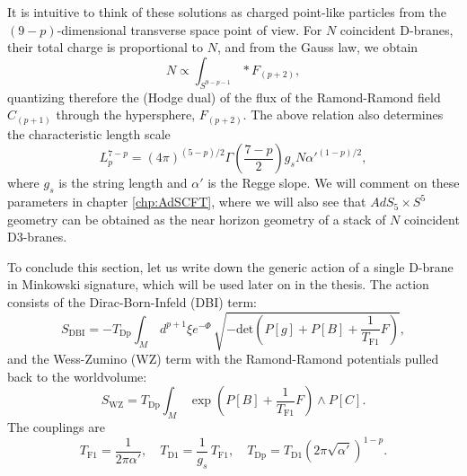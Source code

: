 It is intuitive to think of these solutions as charged point-like particles from the $(9-p)$-dimensional transverse space point of view.
For $N$ coincident D-branes, their total charge is proportional to $N$,
and from the Gauss law, we obtain
\begin{equation}
 N \propto \int_{S^{9-p-1}} *F_{(p+2)},
\end{equation}
quantizing therefore the (Hodge dual) of the flux of the Ramond-Ramond field $C_{(p+1)}$ through the hypersphere, $F_{(p+2)}$.
The above relation also determines the characteristic length scale 
\begin{equation}\label{characteristicLengthLp}
 L_p^{7-p} = (4\pi)^{(5-p)/2} \Gamma \left(\dfrac{7-p}{2}\right) g_s N \alpha'^{(1-p)/2},
\end{equation}
where $g_s$ is the string length and $\alpha'$ is the Regge slope. 
We will comment on these parameters in chapter \ref{chp:AdSCFT},
where we will also see that $AdS_5 \times S^5$ geometry can be obtained as the near horizon geometry of a stack of $N$ coincident D3-branes.

To conclude this section, 
let us write down the generic action of a single D-brane in Minkowski signature, 
which will be used later on in the thesis.
The action consists of the Dirac-Born-Infeld (DBI) term:
\begin{equation}\label{DBI}
 S_\text{DBI} = -T_\text{Dp} \int_M\,  d^{p+1}\xi e^{-\Phi} \, \sqrt{-\text{det}\left( P[g] + P[B] + \dfrac{1}{T_\text{F1}} F \right)},
\end{equation}
and the Wess-Zumino (WZ) term with the Ramond-Ramond potentials pulled back to the worldvolume:
\begin{equation}\label{WZ}
 S_\text{WZ} = T_\text{Dp} \int_M\, \exp{\left(P[B] + \dfrac{1}{T_\text{F1}} F \right)} \wedge  P[C].
\end{equation}
The couplings are
\begin{equation} \label{couplingsTension}
 T_\text{F1} = \dfrac{1}{2\pi\alpha'},
 \quad 
 T_\text{D1} = \dfrac{1}{g_s}\,T_\text{F1},
 \quad 
 T_\text{Dp} =  T_\text{D1}\left(2\pi \sqrt{\alpha'}\right)^{1-p}.
\end{equation}



